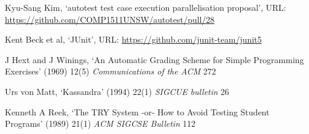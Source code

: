 \documentclass[hidelinks, 12pt]{extreport}
\begin{document}
\begin{thebibliography}{99}
Kyu-Sang Kim, ‘autotest test case execution parallelisation proposal’, URL: \url{https://github.com/COMP1511UNSW/autotest/pull/28}

Kent Beck et al, ‘JUnit’, URL: \url{https://github.com/junit-team/junit5}

J Hext and J Winings, ‘An Automatic Grading Scheme for Simple Programming Exercises’ (1969) 12(5) \textit{Communications of the ACM} 272

Urs von Matt, ‘Kassandra’ (1994) 22(1) \textit{SIGCUE bulletin} 26

Kenneth A Reek, ‘The TRY System -or- How to Avoid Testing Student Programs’ (1989) 21(1) \textit{ACM SIGCSE Bulletin} 112

\end{thebibliography}
\end{document}
